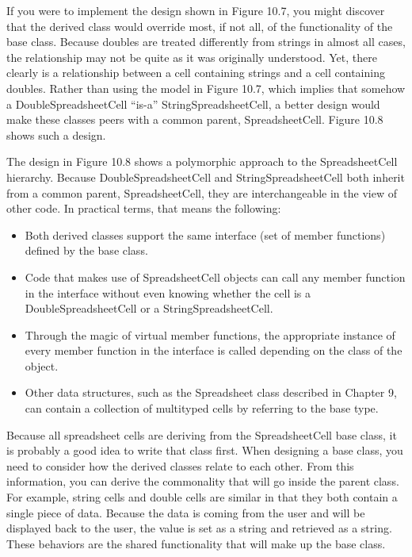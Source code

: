 If you were to implement the design shown in Figure 10.7, you might discover that the derived class would override most, if not all, of the functionality of the base class. Because doubles are treated differently from strings in almost all cases, the relationship may not be quite as it was originally understood. Yet, there clearly is a relationship between a cell containing strings and a cell containing doubles. Rather than using the model in Figure 10.7, which implies that somehow a DoubleSpreadsheetCell “is-a” StringSpreadsheetCell, a better design would make these classes peers with a common parent, SpreadsheetCell. Figure 10.8 shows such a design.


The design in Figure 10.8 shows a polymorphic approach to the SpreadsheetCell hierarchy. Because DoubleSpreadsheetCell and StringSpreadsheetCell both inherit from a common parent, SpreadsheetCell, they are interchangeable in the view of other code. In practical terms, that means the following:

\begin{itemize}
\item
Both derived classes support the same interface (set of member functions) defined by the base class.

\item
Code that makes use of SpreadsheetCell objects can call any member function in the interface without even knowing whether the cell is a DoubleSpreadsheetCell or a StringSpreadsheetCell.

\item
Through the magic of virtual member functions, the appropriate instance of every member function in the interface is called depending on the class of the object.

\item
Other data structures, such as the Spreadsheet class described in Chapter 9, can contain a collection of multityped cells by referring to the base type.
\end{itemize}


Because all spreadsheet cells are deriving from the SpreadsheetCell base class, it is probably a good idea to write that class first. When designing a base class, you need to consider how the derived classes relate to each other. From this information, you can derive the commonality that will go inside the parent class. For example, string cells and double cells are similar in that they both contain a single piece of data. Because the data is coming from the user and will be displayed back to the user, the value is set as a string and retrieved as a string. These behaviors are the shared functionality that will make up the base class.

